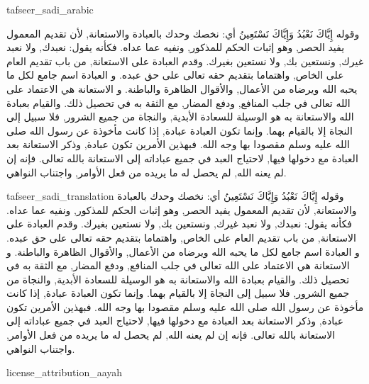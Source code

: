 \begin{taggedblock}{tafseer_sadi_arabic}
\begin{Arabic}
وقوله
{ إِيَّاكَ نَعْبُدُ وَإِيَّاكَ نَسْتَعِينُ }
أي: نخصك وحدك بالعبادة والاستعانة, لأن تقديم المعمول يفيد الحصر, وهو إثبات الحكم للمذكور, ونفيه عما عداه. فكأنه يقول: نعبدك, ولا نعبد غيرك, ونستعين بك, ولا نستعين بغيرك. وقدم العبادة على الاستعانة, من باب تقديم العام على الخاص, واهتماما بتقديم حقه تعالى على حق عبده. و
{ العبادة }
اسم جامع لكل ما يحبه الله ويرضاه من الأعمال, والأقوال الظاهرة والباطنة. و
{ الاستعانة }
هي الاعتماد على الله تعالى في جلب المنافع, ودفع المضار, مع الثقة به في تحصيل ذلك. والقيام بعبادة الله والاستعانة به هو الوسيلة للسعادة الأبدية, والنجاة من جميع الشرور, فلا سبيل إلى النجاة إلا بالقيام بهما. وإنما تكون العبادة عبادة, إذا كانت مأخوذة عن رسول الله صلى الله عليه وسلم مقصودا بها وجه الله. فبهذين الأمرين تكون عبادة, وذكر
{ الاستعانة }
بعد
{ العبادة }
مع دخولها فيها, لاحتياج العبد في جميع عباداته إلى الاستعانة بالله تعالى. فإنه إن لم يعنه الله, لم يحصل له ما يريده من فعل الأوامر, واجتناب النواهي.
\end{Arabic}
\end{taggedblock}
\begin{taggedblock}{tafseer_sadi_translation}
وقوله
{ إِيَّاكَ نَعْبُدُ وَإِيَّاكَ نَسْتَعِينُ }
أي: نخصك وحدك بالعبادة والاستعانة, لأن تقديم المعمول يفيد الحصر, وهو إثبات الحكم للمذكور, ونفيه عما عداه. فكأنه يقول: نعبدك, ولا نعبد غيرك, ونستعين بك, ولا نستعين بغيرك. وقدم العبادة على الاستعانة, من باب تقديم العام على الخاص, واهتماما بتقديم حقه تعالى على حق عبده. و
{ العبادة }
اسم جامع لكل ما يحبه الله ويرضاه من الأعمال, والأقوال الظاهرة والباطنة. و
{ الاستعانة }
هي الاعتماد على الله تعالى في جلب المنافع, ودفع المضار, مع الثقة به في تحصيل ذلك. والقيام بعبادة الله والاستعانة به هو الوسيلة للسعادة الأبدية, والنجاة من جميع الشرور, فلا سبيل إلى النجاة إلا بالقيام بهما. وإنما تكون العبادة عبادة, إذا كانت مأخوذة عن رسول الله صلى الله عليه وسلم مقصودا بها وجه الله. فبهذين الأمرين تكون عبادة, وذكر
{ الاستعانة }
بعد
{ العبادة }
مع دخولها فيها, لاحتياج العبد في جميع عباداته إلى الاستعانة بالله تعالى. فإنه إن لم يعنه الله, لم يحصل له ما يريده من فعل الأوامر, واجتناب النواهي.
\end{taggedblock}
\begin{taggedblock}{license_attribution_aayah}

\end{taggedblock}
\begin{comment}
Please use the following for footnotes:- Sample\footnoteQ{Text of Qur'an footnote goes here.}.
Sample\footnoteT{Text of Tafseer footnote goes here.}.
\end{comment}